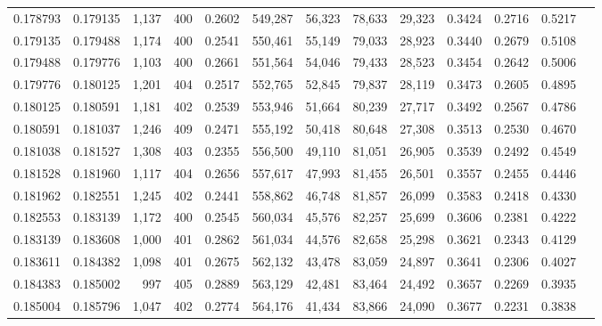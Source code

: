 \begin{tabular}{rrrrrrrrrrrrr}
0.178793 & 0.179135 & 1,137 & 400 &                                     0.2602 & 549,287 &  56,323 &  78,633 &  29,323 & 0.3424 & 0.2716 & 0.5217 \\
0.179135 & 0.179488 & 1,174 & 400 &                                     0.2541 & 550,461 &  55,149 &  79,033 &  28,923 & 0.3440 & 0.2679 & 0.5108 \\
0.179488 & 0.179776 & 1,103 & 400 &                                     0.2661 & 551,564 &  54,046 &  79,433 &  28,523 & 0.3454 & 0.2642 & 0.5006 \\
0.179776 & 0.180125 & 1,201 & 404 &                                     0.2517 & 552,765 &  52,845 &  79,837 &  28,119 & 0.3473 & 0.2605 & 0.4895 \\
0.180125 & 0.180591 & 1,181 & 402 &                                     0.2539 & 553,946 &  51,664 &  80,239 &  27,717 & 0.3492 & 0.2567 & 0.4786 \\
0.180591 & 0.181037 & 1,246 & 409 &                                     0.2471 & 555,192 &  50,418 &  80,648 &  27,308 & 0.3513 & 0.2530 & 0.4670 \\
0.181038 & 0.181527 & 1,308 & 403 &                                     0.2355 & 556,500 &  49,110 &  81,051 &  26,905 & 0.3539 & 0.2492 & 0.4549 \\
0.181528 & 0.181960 & 1,117 & 404 &                                     0.2656 & 557,617 &  47,993 &  81,455 &  26,501 & 0.3557 & 0.2455 & 0.4446 \\
0.181962 & 0.182551 & 1,245 & 402 &                                     0.2441 & 558,862 &  46,748 &  81,857 &  26,099 & 0.3583 & 0.2418 & 0.4330 \\
0.182553 & 0.183139 & 1,172 & 400 &                                     0.2545 & 560,034 &  45,576 &  82,257 &  25,699 & 0.3606 & 0.2381 & 0.4222 \\
0.183139 & 0.183608 & 1,000 & 401 &                                     0.2862 & 561,034 &  44,576 &  82,658 &  25,298 & 0.3621 & 0.2343 & 0.4129 \\
0.183611 & 0.184382 & 1,098 & 401 &                                     0.2675 & 562,132 &  43,478 &  83,059 &  24,897 & 0.3641 & 0.2306 & 0.4027 \\
0.184383 & 0.185002 &   997 & 405 &                                     0.2889 & 563,129 &  42,481 &  83,464 &  24,492 & 0.3657 & 0.2269 & 0.3935 \\
0.185004 & 0.185796 & 1,047 & 402 &                                     0.2774 & 564,176 &  41,434 &  83,866 &  24,090 & 0.3677 & 0.2231 & 0.3838 \\

\end{tabular}
